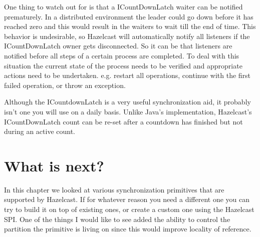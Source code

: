 One thing to watch out for is that a ICountDownLatch waiter can be notified prematurely. In a distributed environment the leader could go down before it has reached zero and this would result in the waiters to wait till the end of time. This behavior is undesirable, so Hazelcast will automatically notify all listeners if the ICountDownLatch owner gets disconnected. So it can be that listeners are notified before all steps of a certain process are completed. To deal with this situation the current state of the process needs to be verified and appropriate actions need to be undertaken. e.g. restart all operations, continue with the first failed operation, or throw an exception.

Although the ICountdownLatch is a very useful synchronization aid, it probably isn't one you will use on a daily basis. Unlike Java's implementation, Hazelcast's ICountDownLatch count can be re-set after a countdown has finished but not during an active count. 

\section{What is next?}
In this chapter we looked at various synchronization primitives that are supported by Hazelcast. If for whatever reason you need a different one you can try to build it on top of existing ones, or create a custom one using the Hazelcast SPI. One of the things I would like to see added the ability to control the partition the primitive is living on since this would improve locality of reference. 
